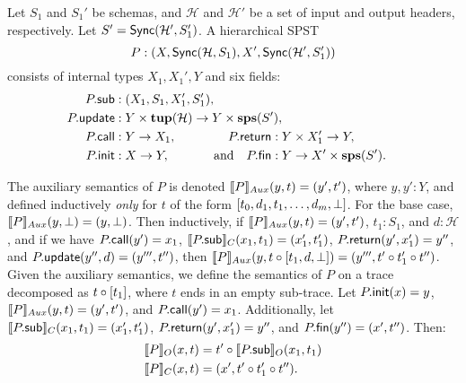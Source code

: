 \begin{definition}
Let $S_1$ and $S_1'$ be schemas, and $\mathcal{H}$ and $\mathcal{H}'$
be a set of input and output headers, respectively.
Let $S' = \hier{\mathcal{H}'}{S_1'}$.
A hierarchical SPST
\[
P : (X, \hier{\mathcal{H}}{S_1}, X', \hier{\mathcal{H}'}{S_1'})
\]
consists of internal types $X_1, X_1', Y$ and
six fields:
\begin{alignat*}{3}
\spstfield{P}{sub} &: (X_1, S_1, X_1', S_1'),
    \hspace{-1em} \\
\spstfield{P}{update} &: Y \times \tup(\mathcal{H}) \to Y \times \sps(S'),
    \hspace{-8em} \\
\spstfield{P}{call} &: Y \to X_1,
    &\spstfield{P}{return} &: Y \times X_1' \to Y, \\
\spstfield{P}{init} &: X \to Y,
    &\text{and} \quad \spstfield{P}{fin} &: Y \to X' \times \sps(S').
\end{alignat*}

The auxiliary semantics of $P$ is denoted
$\spstsemI{y}{t}{P} = (y', t')$, where $y, y': Y$,
and defined inductively
\emph{only} for $t$
of the form $[t_0, d_1, t_1, \ldots, d_m, \spsemp{}]$.
For the base case, $\spstsemI{y}{\spsemp{}}{P} = (y, \spsemp{})$.
Then inductively, if
$\spstsemI{y}{t}{P} = (y', t')$,
$t_1: S_1$, and
$d: \mathcal{H}$,
and if we have
$\spstfield{P}{call}(y') = x_1$,
$\spstsemC{x_1}{t_1}{\spstfield{P}{sub}} = (x_1', t_1')$,
$\spstfield{P}{return}(y', x_1') = y''$,
and $\spstfield{P}{update}(y'', d) = (y''', t'')$,
then
$\spstsemI{y}{t \circ \spsseq{t_1, d, \spsemp}}{P} = (y''', t' \circ t_1' \circ t'')$.
Given the auxiliary semantics, we define the semantics
of $P$ on a trace decomposed as $t \circ \spsseq{t_1}$,
where $t$ ends in an empty sub-trace.
Let
$\spstfield{P}{init}(x) = y$,
$\spstsemI{y}{t}{P} = (y', t')$,
and $\spstfield{P}{call}(y') = x_1$.
Additionally, let
$\spstsemC{x_1}{t_1}{\spstfield{P}{sub}} = (x_1', t_1')$,
$\spstfield{P}{return}(y', x_1') = y''$,
and $\spstfield{P}{fin}(y'') = (x', t'')$.
Then:
\begin{align*}
\spstsemO{x}{t}{P}
    &= t' \circ \spstsemO{x_1}{t_1}{\spstfield{P}{sub}} \\
\spstsemC{x}{t}{P}
    &= (x', t' \circ t_1' \circ t'').
\end{align*}
\end{definition}


